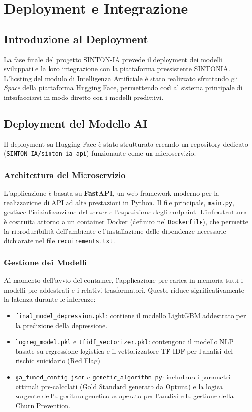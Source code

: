 \chapter{Deployment e Integrazione}

\section{Introduzione al Deployment}
La fase finale del progetto SINTON-IA prevede il deployment dei modelli sviluppati e la loro integrazione con la piattaforma preesistente SINTONIA. L'hosting del modulo di Intelligenza Artificiale è stato realizzato sfruttando gli \textit{Space} della piattaforma Hugging Face, permettendo così al sistema principale di interfacciarsi in modo diretto con i modelli predittivi.

\section{Deployment del Modello AI}
Il deployment su Hugging Face è stato strutturato creando un repository dedicato (\texttt{SINTON-IA/sinton-ia-api}) funzionante come un microservizio.

\subsection{Architettura del Microservizio}
L'applicazione è basata su \textbf{FastAPI}, un web framework moderno per la realizzazione di API ad alte prestazioni in Python. Il file principale, \texttt{main.py}, gestisce l'inizializzazione del server e l'esposizione degli endpoint. L'infrastruttura è costruita attorno a un container Docker (definito nel \texttt{Dockerfile}), che permette la riproducibilità dell'ambiente e l'installazione delle dipendenze necessarie dichiarate nel file \texttt{requirements.txt}.

\subsection{Gestione dei Modelli}
Al momento dell'avvio del container, l'applicazione pre-carica in memoria tutti i modelli pre-addestrati e i relativi trasformatori. Questo riduce significativamente la latenza durante le inferenze:
\begin{itemize}
    \item \texttt{final\_model\_depression.pkl}: contiene il modello LightGBM addestrato per la predizione della depressione.
    \item \texttt{logreg\_model.pkl} e \texttt{tfidf\_vectorizer.pkl}: contengono il modello NLP basato su regressione logistica e il vettorizzatore TF-IDF per l'analisi del rischio suicidario (Red Flag).
    \item \texttt{ga\_tuned\_config.json} e \texttt{genetic\_algorithm.py}: includono i parametri ottimali pre-calcolati (Gold Standard generato da Optuna) e la logica sorgente dell'algoritmo genetico adoperato per l'analisi e la gestione della Churn Prevention.
\end{itemize}

